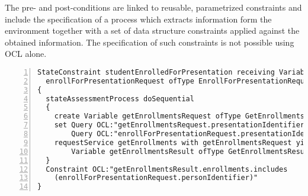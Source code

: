 The pre- and post-conditions are linked to reusable, parametrized constraints and include the specification of a process which extracts information form the environment together with a set of data structure constraints applied against the obtained information. The specification of such constraints is not possible using OCL alone.
\tiny \begin{lstlisting}[numbers=left,escapechar=|]
StateConstraint studentEnrolledForPresentation receiving Variable 
  enrollForPresentationRequest ofType EnrollForPresentationRequest
{
  stateAssessmentProcess doSequential
  {
    create Variable getEnrollmentsRequest ofType GetEnrollmentsRequest
    set Query OCL:"getEnrollmentsRequest.presentationIdentifier" equalTo
        Query OCL:"enrollForPresentationRequest.presentationIdentifier"
    requestService getEnrollments with getEnrollmentsRequest yielding
        Variable getEnrollmentsResult ofType GetEnrollmentsResult
  }
  Constraint OCL:"getEnrollmentsResult.enrollments.includes
    (enrollForPresentationRequest.personIdentifier)"
}
\end{lstlisting}\normalsize

